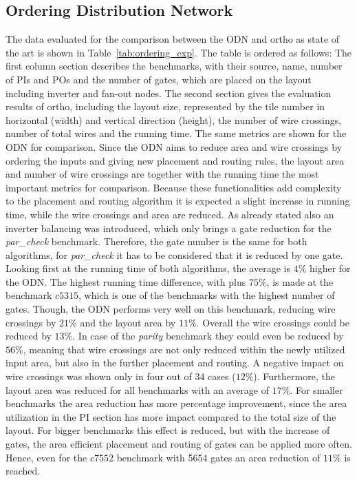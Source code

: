 \subsection{Ordering Distribution Network}
The data evaluated for the comparison between the ODN and ortho as state of the art is shown in Table~\ref{tab:ordering_exp}. The table is ordered as follows: The first column section describes the benchmarks, with their source, name, number of PIs and POs and the number of gates, which are placed on the layout including inverter and fan-out nodes. The second section gives the evaluation results of ortho, including the layout size, represented by the tile number in horizontal (width) and vertical direction (height), the number of wire crossings, number of total wires and the running time. The same metrics are shown for the ODN for comparison.
Since the ODN aims to reduce area and wire crossings by ordering the inputs and giving new placement and routing rules, the layout area and number of wire crossings are together with the running time the most important metrics for comparison. Because these functionalities add complexity to the placement and routing algorithm it is expected a slight increase in running time, while the wire crossings and area are reduced. As already stated also an inverter balancing was introduced, which only brings a gate reduction for the \textit{par\_check} benchmark. Therefore, the gate number is the same for both algorithms, for \textit{par\_check} it has to be considered that it is reduced by one gate. Looking first at the running time of both algorithms, the average is $4\%$ higher for the ODN. The highest running time difference, with plus $75\%$, is made at the benchmark $c5315$, which is one of the benchmarks with the highest number of gates. Though, the ODN performs very well on this benchmark, reducing wire crossings by $21\%$ and the layout area by $11\%$. Overall the wire crossings could be reduced by $13\%$. In case of the \textit{parity} benchmark they could even be reduced by $56\%$, meaning that wire crossings are not only reduced within the newly utilized input area, but also in the further placement and routing. A negative impact on wire crossings was shown only in four out of 34 cases ($12\%$). Furthermore, the layout area was reduced for all benchmarks with an average of $17\%$. For smaller benchmarks the area reduction has more percentage improvement, since the area utilization in the PI section has more impact compared to the total size of the layout. For bigger benchmarks this effect is reduced, but with the increase of gates, the area efficient placement and routing of gates can be applied more often. Hence, even for the $c7552$ benchmark with 5654 gates an area reduction of $11\%$ is reached.
 
